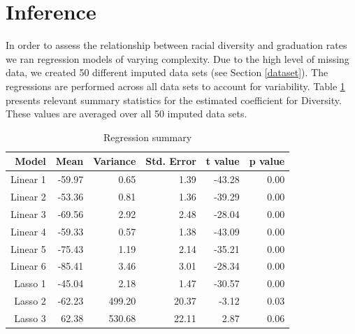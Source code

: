 \documentclass{article}
\begin{document}
\section{Inference}

In order to assess the relationship between racial diversity and graduation rates we ran regression models of varying complexity. Due to the high level of missing data, we created 50 different imputed data sets (see Section \ref{dataset}).  The regressions are performed across all data sets to account for variability.  Table \ref{regresults} presents relevant summary statistics for the estimated coefficient for Diversity. These values are averaged over all 50 imputed data sets.

\begin{table}[ht]
\caption{Regression summary}
\label{regresults}
\centering
\begin{tabular}{rrrrrr}
  \hline
Model & Mean & Variance & Std. Error & t value & p value \\ 
  \hline
Linear 1 & -59.97 & 0.65 & 1.39 & -43.28 & 0.00 \\ 
  Linear 2 & -53.36 & 0.81 & 1.36 & -39.29 & 0.00 \\ 
  Linear 3 & -69.56 & 2.92 & 2.48 & -28.04 & 0.00 \\ 
   Linear 4 & -59.33 & 0.57 & 1.38 & -43.09 & 0.00 \\ 
  Linear 5 & -75.43 & 1.19 & 2.14 & -35.21 & 0.00 \\ 
  Linear 6 & -85.41 & 3.46 & 3.01 & -28.34 & 0.00 \\ 
  Lasso 1 & -45.04 & 2.18 & 1.47 & -30.57 & 0.00 \\
  Lasso 2 & -62.23 & 499.20 & 20.37 & -3.12 & 0.03 \\
  Lasso 3 & 62.38 & 530.68 & 22.11 & 2.87 & 0.06 \\
   \hline
\end{tabular}
\end{table}
\end{document}
